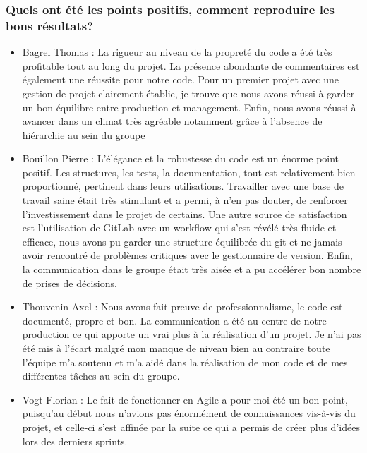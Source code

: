 \documentclass[a4paper, 12pt]{report}
\begin{document}
\subsubsection*{Quels ont été les points positifs, comment reproduire les bons résultats?}
\begin{itemize}

\item
  Bagrel Thomas :
  La rigueur au niveau de la propreté du code a été très profitable tout au long du projet. La présence abondante de commentaires est également une réussite pour notre code. Pour un premier projet avec une gestion de projet clairement établie, je trouve que nous avons réussi à garder un bon équilibre entre production et management. Enfin, nous avons réussi à avancer dans un climat très agréable notamment grâce à l’absence de hiérarchie au sein du groupe

\item
  Bouillon Pierre :
  L'élégance et la robustesse du code est un énorme point positif. Les structures, les tests, la documentation, tout est relativement bien proportionné, pertinent dans leurs utilisations. Travailler avec une base de travail saine était très stimulant et a permi, à n'en pas douter, de renforcer l'investissement dans le projet de certains.
  Une autre source de satisfaction est l'utilisation de GitLab avec un workflow qui s'est révélé très fluide et efficace, nous avons pu garder une structure équilibrée du git et ne jamais avoir rencontré de problèmes critiques avec le gestionnaire de version.
  Enfin, la communication dans le groupe était très aisée et a pu accélérer bon nombre de prises de décisions.
 
\item
  Thouvenin Axel :
  Nous avons fait preuve de professionnalisme, le code est documenté, propre et bon.  La communication a été au centre de notre production ce qui apporte un vrai plus à la réalisation d’un projet. Je n’ai pas été mis à l’écart malgré mon manque de niveau bien au contraire toute l’équipe m'a soutenu et m’a aidé dans la réalisation de mon code et de mes différentes tâches au sein du groupe.

\item
  Vogt Florian :
  Le fait de fonctionner en Agile a pour moi été un bon point, puisqu’au début nous n’avions pas énormément de connaissances vis-à-vis du projet, et celle-ci s’est affinée par la suite ce qui a permis de créer plus d’idées lors des derniers sprints.

\end{itemize}
\end{document}
